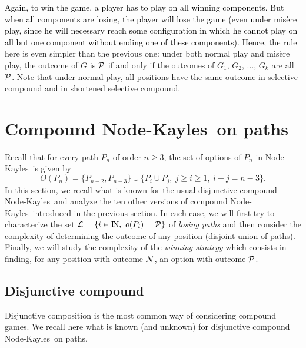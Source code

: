 \documentclass[11pt]{article}
\newcommand{\modif}[1]{\textcolor{black}{#1}}
\newcommand{\NK}{Node-Kayles}
\newcommand{\NN}{{\cal N}}
\newcommand{\PP}{{\cal P}}
\def\N{\mbox{I\hspace{-.15em}N}}
\newcommand{\LL}{{\cal L}}
\begin{document}
\vskip 4mm

\modif{Again, to win the game, a player
has to play on all winning components. But when
all components are losing, the player will lose
the game (even under mis\`ere play, since he will
necessary reach some configuration in which he cannot
play on all but one component without ending one
of these components).
Hence,
the} rule here is even simpler than the previous one:
under both normal play and mis\`ere play, 
the outcome of $G$ is $\PP$ if and only if the
outcomes of $G_1$, $G_2$, $\dots$, $G_k$ are all $\PP$.
Note that under normal play, all positions have the same outcome
in selective compound and in shortened selective compound.

\section{Compound \NK\ on paths}
\label{sec:variations}

Recall that for every path $P_n$ of order $n\ge 3$, the set of
options of $P_n$ in \NK\ is given by
\begin{equation}
O(P_n)=\{P_{n-2},P_{n-3}\}\cup\{P_i\cup P_j,\ 
j\ge i\ge 1,\ i+j=n-3\}.
\label{eq:options_Pn}
\end{equation}
In this section, we recall what is known for the usual disjunctive
compound \NK\
and analyze the ten other versions of compound \NK\ introduced in
the previous section. In each case, we will first try to characterize
the set $\LL=\{i\in\N,\ o(P_i)=\PP\}$ of {\em losing paths}
and then consider the complexity of determining the
outcome of any position (disjoint union of paths).
Finally, we will study the complexity of the {\em winning strategy} which
consists in finding, for any position 
with outcome
$\NN$, an option with outcome $\PP$.

\subsection{Disjunctive compound}
\label{sec:disjunctive}

Disjunctive composition is the most common way of considering
compound games. We recall here what is known (and unknown) for
disjunctive compound \NK\ on paths.

\vskip 4mm
\end{document}
